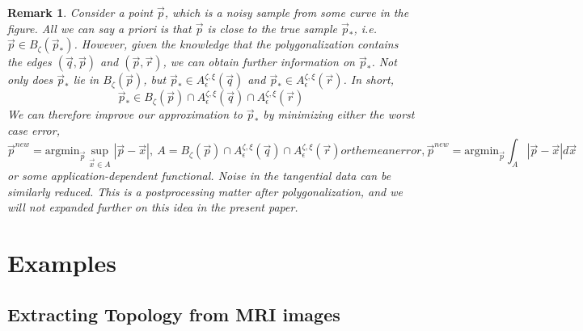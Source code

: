 \documentclass{article}
\newtheorem{varremark}[cntr]{Remark}
\newenvironment{remark}{\begin{varremark}\em}{\em\end{varremark}}
\numberwithin{cntr}{section}
\numberwithin{equation}{section}
\newcommand{\abs}[1]{\left| #1 \right|}%
\newcommand{\vx}[0]{{\vec{x}}}
\newcommand{\vp}[0]{{\vec{p}}}
\newcommand{\vq}[0]{{\vec{q}}}
\newcommand{\vr}[0]{{\vec{r}}}
\newcommand{\ball}[2]{ { B_{#1}(#2) } }
\newcommand{\pointNoise}{{\zeta}}
\newcommand{\tanNoise}{{\xi}}
\newcommand{\nallowed}[2]{ { A^{\pointNoise, \tanNoise}_{#1}(#2) } }
\begin{document}
\begin{remark}
Consider a point $\vp$, which is a noisy sample from some curve in the figure.
All we can say a priori is that $\vp$ is close to the true
sample $\vp_{\ast}$, i.e. $\vp \in \ball{\pointNoise}{\vp_{\ast}}$.
However, given the knowledge that the polygonalization contains
the edges $(\vq,\vp)$ and $(\vp,\vr)$, we can obtain further information
on $\vp_{\ast}$. Not only does $\vp_{\ast}$ lie in $\ball{\pointNoise}{\vp}$,
but $\vp_{\ast} \in \nallowed{\epsilon}{\vq}$ and
$\vp_{\ast} \in \nallowed{\epsilon}{\vr}$. In short,
\begin{equation}
  \label{eq:noisyFilteringFromAllowedRegions}
  \vp_{\ast} \in \ball{\pointNoise}{\vp} \cap \nallowed{\epsilon}{\vq} \cap  \nallowed{\epsilon}{\vr}
\end{equation}
We can therefore improve our approximation to $\vp_{\ast}$ by minimizing
either the worst case error,
\begin{subequations}
  \begin{equation}
    \vp^{new} = \textrm{argmin}_{\vp}  \sup_{\vx \in A} \abs{\vp - \vx}, ~ A = \ball{\pointNoise}{\vp} \cap \nallowed{\epsilon}{\vq} \cap  \nallowed{\epsilon}{\vr}
  \end{equation}
  or the mean error,
  \begin{equation}
    \vp^{new} = \textrm{argmin}_{\vp}  \int_{A} \abs{\vp - \vx} d\vx
  \end{equation}
\end{subequations}
or some application-dependent functional.
Noise in the tangential data can be similarly reduced.
This is a postprocessing matter after polygonalization,
and we will not expanded further on this idea in the present paper.
\end{remark}

\section{Examples}

\subsection{Extracting Topology from MRI images}
\end{document}
